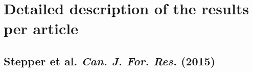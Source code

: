 %	
%	
%	

\section[Detailed description of the results]{Detailed description of the results per article}\label{sec:detailedResults}

\subsection[Stepper et al. \emph{Can. J. For. Res.} (2015)]
		{Stepper et al.\; 
		\emph{Can. J. For. Res.}
		(2015) }
\label{sec:pub.CanJForRes2015}

